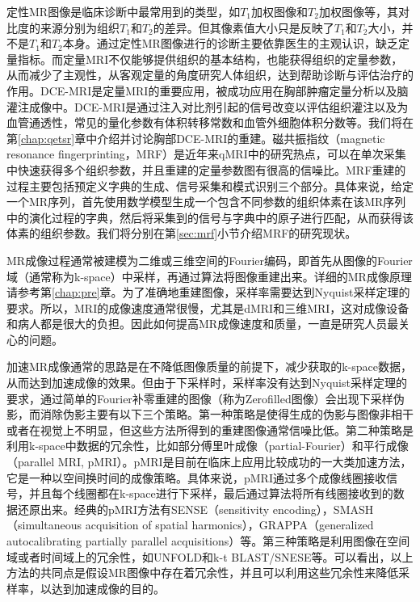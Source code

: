 定性MR图像是临床诊断中最常用到的类型，如$T_1$加权图像和$T_2$加权图像等，其对比度的来源分别为组织$T_1$和$T_2$的差异。但其像素值大小只是反映了$T_1$和$T_2$大小，并不是$T_1$和$T_2$本身。通过定性MR图像进行的诊断主要依靠医生的主观认识，缺乏定量指标。而定量MRI不仅能够提供组织的基本结构，也能获得组织的定量参数，从而减少了主观性，从客观定量的角度研究人体组织，达到帮助诊断与评估治疗的作用。DCE-MRI\cite{Yankeelov2009}是定量MRI的重要应用，被成功应用在胸部肿瘤定量分析以及脑灌注成像中。DCE-MRI是通过注入对比剂引起的信号改变以评估组织灌注以及为血管通透性，常见的量化参数有体积转移常数\kt 和血管外细胞体积分数\Ve 等。我们将在第\ref{chap:qetsr}章中介绍并讨论胸部DCE-MRI的重建。磁共振指纹\cite{mrf}（magnetic resonance fingerprinting，MRF）是近年来qMRI中的研究热点，可以在单次采集中快速获得多个组织参数，并且重建的定量参数图有很高的信噪比。MRF重建的过程主要包括预定义字典的生成、信号采集和模式识别三个部分。具体来说，给定一个MR序列，首先使用数学模型生成一个包含不同参数的组织体素在该MR序列中的演化过程的字典，然后将采集到的信号与字典中的原子进行匹配，从而获得该体素的组织参数。我们将分别在第\ref{sec:mrf}小节介绍MRF的研究现状。

MR成像过程通常被建模为二维或三维空间的Fourier编码，即首先从图像的Fourier域（通常称为k-space）中采样，再通过算法将图像重建出来。详细的MR成像原理请参考第\ref{chap:pre}章。为了准确地重建图像，采样率需要达到Nyquist采样定理\cite{Nyquist}的要求。所以，MRI的成像速度通常很慢，尤其是dMRI和三维MRI，这对成像设备和病人都是很大的负担。因此如何提高MR成像速度和质量，一直是研究人员最关心的问题。

加速MR成像通常的思路是在不降低图像质量的前提下，减少获取的k-space数据，从而达到加速成像的效果。但由于下采样时，采样率没有达到Nyquist采样定理的要求，通过简单的Fourier补零重建的图像（称为Zerofilled图像）会出现下采样伪影，而消除伪影主要有以下三个策略。第一种策略是使得生成的伪影与图像非相干或者在视觉上不明显\cite{Tsai,Marseille,Greiser}，但这些方法所得到的重建图像通常信噪比低。第二种策略是利用k-space中数据的冗余性，比如部分傅里叶成像\cite{McGibney}（partial-Fourier）和平行成像（parallel MRI, pMRI）。pMRI是目前在临床上应用比较成功的一大类加速方法，它是一种以空间换时间的成像策略。具体来说，pMRI通过多个成像线圈接收信号，并且每个线圈都在k-space进行下采样，最后通过算法将所有线圈接收到的数据还原出来。经典的pMRI方法有SENSE（sensitivity encoding）\cite{sense}，SMASH（simultaneous acquisition of spatial harmonics）\cite{smash}，GRAPPA（generalized autocalibrating partially parallel acquisitions）\cite{grappa}等。第三种策略是利用图像在空间域或者时间域上的冗余性，如UNFOLD\cite{Madore}和k-t BLAST/SNESE\cite{Jeffrey2003k}等。可以看出，以上方法的共同点是假设MR图像中存在着冗余性，并且可以利用这些冗余性来降低采样率，以达到加速成像的目的。

